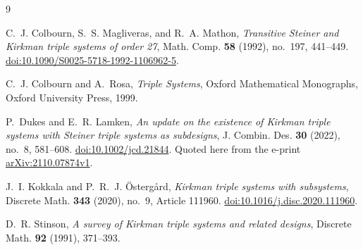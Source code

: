 \documentclass[11pt]{amsart}
\theoremstyle{remark}
\begin{document}
\begin{thebibliography}{9}

C.~J. Colbourn, S.~S. Magliveras, and R.~A. Mathon,
\emph{Transitive Steiner and Kirkman triple systems of order 27},
Math. Comp. \textbf{58} (1992), no.~197, 441--449.
\href{https://doi.org/10.1090/S0025-5718-1992-1106962-5}
{doi:10.1090/S0025-5718-1992-1106962-5}.

C.~J. Colbourn and A.~Rosa,
\emph{Triple Systems},
Oxford Mathematical Monographs, Oxford University Press, 1999.

P.~Dukes and E.~R. Lamken,
\emph{An update on the existence of Kirkman triple systems with Steiner triple
systems as subdesigns},
J. Combin. Des. \textbf{30} (2022), no.~8, 581--608.
\href{https://doi.org/10.1002/jcd.21844}{doi:10.1002/jcd.21844}.
Quoted here from the e-print
\href{https://arxiv.org/abs/2110.07874v1}{arXiv:2110.07874v1}.

J.~I. Kokkala and P.~R.~J. \"Osterg\aa rd,
\emph{Kirkman triple systems with subsystems},
Discrete Math. \textbf{343} (2020), no.~9, Article 111960.
\href{https://doi.org/10.1016/j.disc.2020.111960}{doi:10.1016/j.disc.2020.111960}.

D.~R. Stinson,
\emph{A survey of Kirkman triple systems and related designs},
Discrete Math. \textbf{92} (1991), 371--393.

\end{thebibliography}
\end{document}
